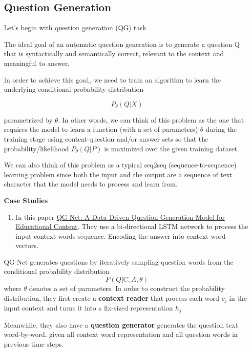 \documentclass[]{book}
\providecommand{\tightlist}{%
  \setlength{\itemsep}{0pt}\setlength{\parskip}{0pt}}
\theoremstyle{definition}
\theoremstyle{definition}
\theoremstyle{definition}
\theoremstyle{remark}
\begin{document}
\subsection{Question Generation}\label{question-generation}

Let's begin with question generation (QG) task.

The ideal goal of an automatic question generation is to generate a
question Q that is syntactically and semantically correct, relevant to
the context and meaningful to answer.

In order to achieve this goal,, we need to train an algorithm to learn
the underlying conditional probability distribution

\[P_{\theta}(Q|X)\]

parametrized by \(\theta\). In other words, we can think of this problem
as the one that requires the model to learn a function (with a set of
parameters) \(\theta\) during the training stage using content-question
and/or answer sets so that the probability/likelihood
\(P_{\theta}(Q|P)\) is maximized over the given training dataset.

We can also think of this problem as a typical seq2seq
(sequence-to-sequence) learning problem since both the input and the
output are a sequence of text character that the model needs to process
and learn from.

\textbf{Case Studies}

\begin{enumerate}
\def\labelenumi{\arabic{enumi}.}
\tightlist
\item
  In this paper
  \href{http://www.princeton.edu/~shitingl/papers/18l@s-qgen.pdf}{QG-Net:
  A Data-Driven Question Generation Model for Educational Content}. They
  use a bi-directional LSTM network to process the input context words
  sequence. Encoding the answer into context word vectors.
\end{enumerate}

QG-Net generates questions by iteratively sampling question words from
the conditional probability distribution \[P(Q|C,A,\theta)\] where
\(\theta\) denotes a set of parameters. In order to construct the
probability distribution, they first create a \textbf{context reader}
that process each word \(c_j\) in the input context and turns it into a
fix-sized representation \(h_j\)

Meanwhile, they also have a \textbf{question generator} generates the
question text word-by-word, given all context word representation and
all question words in previous time steps.
\end{document}
